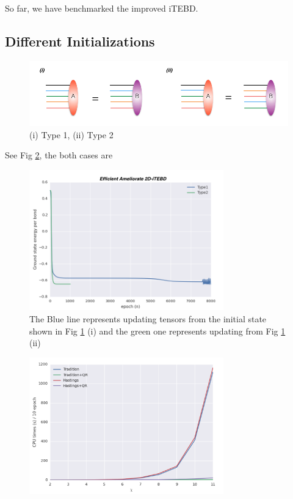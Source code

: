 So far, we have benchmarked the improved iTEBD. 

\label{Comparison}
\subsection{Different Initializations}

\begin{figure}[ht]
	\centering
	\includegraphics[width=1.00\textwidth]{figures/fig322.png}
	\caption[Different methods to initialize the states]{(i) Type 1, (ii) Type 2}
	\label{fig322}
\end{figure}

See Fig \ref{fig323}, the both cases are 

\begin{figure}[ht]
	\centering
	\includegraphics[width=0.75\textwidth]{figures/fig323.png}
	\caption[Comparison the results of Heisenberg model on square lattice which are obtaining from different initial states.]{The Blue line represents updating tensors from the initial state shown in Fig \ref{fig322} (i) and the green one represents updating from Fig \ref{fig322} (ii)}
	\label{fig323}
\end{figure}

\begin{figure}[ht]
	\centering
	\includegraphics[width=0.75\textwidth]{figures/fig324.png}
	\caption[CPU times of different 2D-iTEBD with fixed trucation error]{}
	\label{fig324}
\end{figure}

